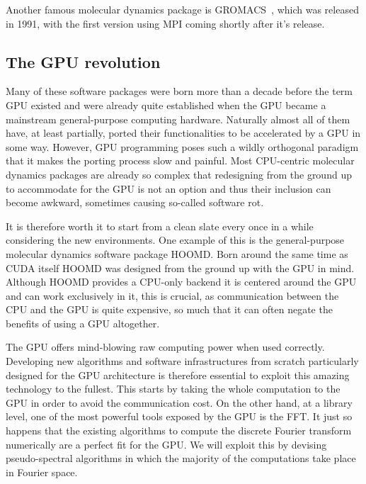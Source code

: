 \documentclass[twoside,openright,titlepage,numbers=noenddot,%
headinclude,footinclude,cleardoublepage=empty,abstract=on,
BCOR=5mm,fontsize=11pt, dvipsnames, paper=b5
]{scrreprt}
\newcommand{\gpu}{\gls{GPU}\xspace}
\begin{document}
Another famous molecular dynamics package is GROMACS~\cite{Berendsen1995}, which was released in 1991, with the first version using MPI coming shortly after it's release.

\subsection*{The GPU revolution}
Many of these software packages were born more than a decade before the term \gpu existed and were already quite established when the \gpu became a mainstream general-purpose computing hardware. Naturally almost all of them have, at least partially, ported their functionalities to be accelerated by a \gpu in some way. However, \gpu programming poses such a wildly orthogonal paradigm that it makes the porting process slow and painful. Most CPU-centric molecular dynamics packages are already so complex that redesigning from the ground up to accommodate for the \gpu is not an option and thus their inclusion can become awkward, sometimes causing so-called software rot.

It is therefore worth it to start from a clean slate every once in a while considering the new environments. One example of this is the general-purpose molecular dynamics software package HOOMD\cite{Anderson2008}. Born around the same time as CUDA itself HOOMD was designed from the ground up with the \gpu in mind. Although HOOMD provides a CPU-only backend it is centered around the \gpu and can work exclusively in it, this is crucial, as communication between the CPU and the \gpu is quite expensive, so much that it can often negate the benefits of using a \gpu altogether.

The \gpu offers mind-blowing raw computing power when used correctly. Developing new algorithms and software infrastructures from scratch particularly designed for the \gpu architecture is therefore essential to exploit this amazing technology to the fullest. This starts by taking the whole computation to the \gpu in order to avoid the communication cost. On the other hand, at a library level, one of the most powerful tools exposed by the \gpu is the \gls{FFT}. It just so happens that the existing algorithms to compute the discrete Fourier transform numerically are a perfect fit for the \gpu. We will exploit this by devising pseudo-spectral algorithms in which the majority of the computations take place in Fourier space.
\end{document}
